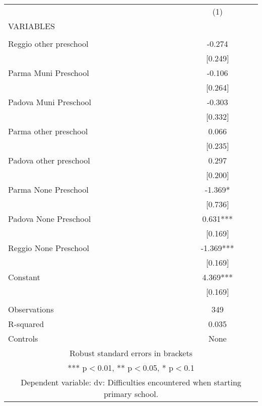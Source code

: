\begin{tabular}{lc} \hline
 & (1) \\
VARIABLES &  \\ \hline
 &  \\
Reggio other preschool & -0.274 \\
 & [0.249] \\
Parma Muni Preschool & -0.106 \\
 & [0.264] \\
Padova Muni Preschool & -0.303 \\
 & [0.332] \\
Parma other preschool & 0.066 \\
 & [0.235] \\
Padova other preschool & 0.297 \\
 & [0.200] \\
Parma None Preschool & -1.369* \\
 & [0.736] \\
Padova None Preschool & 0.631*** \\
 & [0.169] \\
Reggio None Preschool & -1.369*** \\
 & [0.169] \\
Constant & 4.369*** \\
 & [0.169] \\
 &  \\
Observations & 349 \\
R-squared & 0.035 \\
 Controls & None \\ \hline
\multicolumn{2}{c}{ Robust standard errors in brackets} \\
\multicolumn{2}{c}{ *** p$<$0.01, ** p$<$0.05, * p$<$0.1} \\
\multicolumn{2}{c}{ Dependent variable: dv: Difficulties encountered when starting primary school.} \\
\end{tabular}
